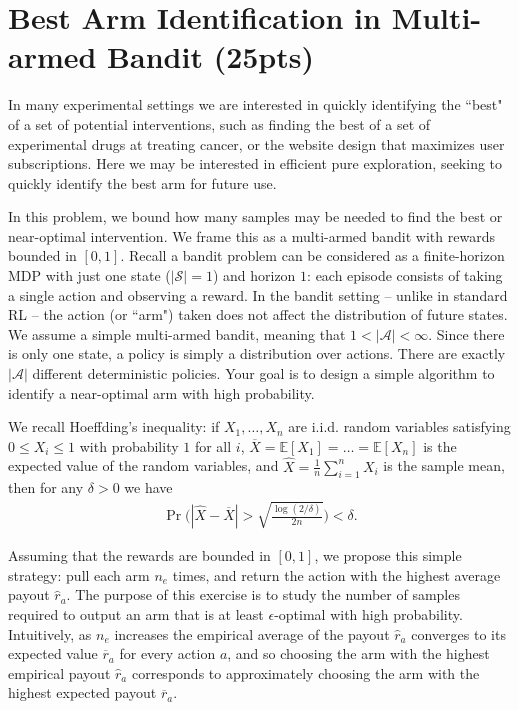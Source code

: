 \documentclass{article}
\newcommand{\E}{\mathbb{E}}
\begin{document}
\section{Best Arm Identification in Multi-armed Bandit (25pts)}

In many experimental settings we are interested in quickly identifying the ``best" of a set of potential interventions, such as finding the best of a set of experimental drugs at treating cancer, or the website design that maximizes user subscriptions. Here we may be interested in efficient pure exploration, seeking to quickly identify the best arm for future use. 

In this problem, we bound how many samples may be needed to find the best or near-optimal intervention. We frame this as a multi-armed bandit with rewards bounded in $[0,1]$. Recall a bandit problem can be considered as a finite-horizon MDP with just one state ($|\mathcal{S}| = 1$) and horizon $1$: each episode consists of taking a single action and observing a reward. In the bandit setting -- unlike in standard RL --  the action (or ``arm") taken does not affect the distribution of future states.
We assume a simple multi-armed bandit, meaning that $1 < |\mathcal{A}| < \infty$. Since there is only one state, a policy is simply a distribution over actions. There are exactly $|\mathcal{A}|$ different deterministic policies. Your goal is to design a simple algorithm to identify a near-optimal arm with high probability.

We recall Hoeffding's inequality: if $X_1,\dots,X_n$ are i.i.d. random variables satisfying $0 \le X_i \le 1$ with probability $1$ for all $i$, $\overline X = \E[X_1] = \dots = \E[X_n]$ is the expected value of the random variables, and $\widehat X = \frac{1}{n} \sum_{i=1}^n X_i$ is the sample mean, then for any $\delta > 0$ we have
\begin{align}
\Pr\Bigg(|\widehat X - \overline X | > \sqrt{\frac{\log(2/\delta)}{2n}}	\Bigg) < \delta.
\end{align}

Assuming that the rewards are bounded in $[0,1]$,
we propose this simple strategy: pull each arm $n_e$ times, and return the action with the highest average payout $\widehat r_a$. The purpose of this exercise is to study the number of samples required to output an arm that is at least $\epsilon$-optimal with high probability.
Intuitively, as $n_e$ increases the empirical average of the payout $\widehat r_a$ converges to its expected value $\overline r_a$ for every action $a$, and so choosing the arm with the highest empirical payout $\widehat r_a$ corresponds to approximately choosing the arm with the highest expected payout $\overline r_a$.
\end{document}
